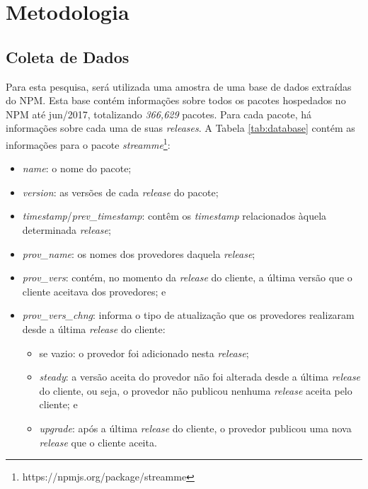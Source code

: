 \chapter{Metodologia}
\label{cap:metodologia}

\section{Coleta de Dados}
\label{sec:col_dados}
Para esta pesquisa, será utilizada uma amostra de uma base de dados extraídas do \gls{NPM}. Esta base contém informações sobre todos os pacotes hospedados no \gls{NPM} até jun/2017, totalizando \textit{366,629} pacotes. Para cada pacote, há informações sobre cada uma de suas \textit{releases}. A Tabela \ref{tab:database} contém as informações para o pacote \textit{streamme}\footnote{https://npmjs.org/package/streamme}:

\begin{itemize}
    \item \textit{name}: o nome do pacote;
    \item \textit{version}: as versões de cada \textit{release} do pacote;
    \item \textit{timestamp}/\textit{prev\_timestamp}: contêm os \textit{timestamp} relacionados àquela determinada \textit{release};
    \item \textit{prov\_name}: os nomes dos provedores daquela \textit{release};
    \item \textit{prov\_vers}: contém, no momento da \textit{release} do cliente, a última versão que o cliente aceitava dos provedores; e
    \item \textit{prov\_vers\_chng}: informa o tipo de atualização que os provedores realizaram desde a última \textit{release} do cliente:
    \begin{itemize}
        \item se vazio: o provedor foi adicionado nesta \textit{release};
        \item \textit{steady}: a versão aceita do provedor não foi alterada desde a última \textit{release} do cliente, ou seja, o provedor não publicou nenhuma \textit{release} aceita pelo cliente; e
        \item \textit{upgrade}: após a última \textit{release} do cliente, o provedor publicou uma nova \textit{release} que o cliente aceita.
    \end{itemize}
\end{itemize}{}
  
